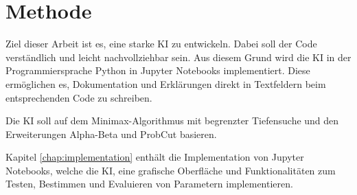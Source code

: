 
\chapter{Methode}
\label{chap:methode}

Ziel dieser Arbeit ist es, eine starke KI zu entwickeln. Dabei soll der Code verständlich und leicht nachvollziehbar
sein. Aus diesem Grund wird die KI in der Programmiersprache Python in Jupyter Notebooks implementiert. Diese
ermöglichen es, Dokumentation und Erklärungen direkt in Textfeldern beim entsprechenden Code zu schreiben.

Die KI soll auf dem Minimax-Algorithmus mit begrenzter Tiefensuche und den Erweiterungen Alpha-Beta und ProbCut
basieren.

Kapitel \ref{chap:implementation} enthält die Implementation von Jupyter Notebooks, welche die KI, eine grafische Oberfläche und Funktionalitäten zum Testen, Bestimmen und Evaluieren von Parametern implementieren.
